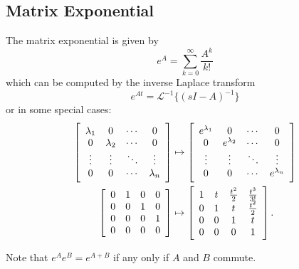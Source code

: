 \documentclass{report}
\begin{document}
\subsection{Matrix Exponential}
The matrix exponential is given by
$$
e^{A} = \sum_{k=0}^\infty \frac{A^k}{k!}
$$
which can be computed by the inverse Laplace transform
$$
e^{At} = \mathcal{L}^{-1}\{(sI - A)^{-1}\}
$$
or in some special cases:
\begin{align*}
\left[\begin{array}{c c c c}
  \lambda_1 & 0          & \cdots & 0      \\
  0         & \lambda_2  & \cdots & 0      \\
  \vdots    & \vdots     & \ddots & \vdots \\
  0         & 0          & \cdots & \lambda_n
\end{array}\right]
& \mapsto
\left[\begin{array}{c c c c}
  e^{\lambda_1} & 0           & \cdots & 0      \\
  0           & e^{\lambda_2} & \cdots & 0      \\
  \vdots      & \vdots      & \ddots & \vdots \\
  0           & 0           & \cdots & e^{\lambda_n}
\end{array}\right] \\
\left[\begin{array}{c c c c c}
  0 & 1 & 0 & 0 \\
  0 & 0 & 1 & 0 \\
  0 & 0 & 0 & 1 \\
  0 & 0 & 0 & 0
\end{array}\right]
& \mapsto
\left[\begin{array}{c c c c}
  1 & t & \frac{t^2}{2} & \frac{t^3}{3!} \\
  0 & 1 & t             & \frac{t^2}{2}  \\
  0 & 0 & 1             & t              \\
  0 & 0 & 0             & 1
\end{array}\right].
\end{align*}

Note that $e^{A} e^{B} = e^{A + B}$ if any only if $A$ and $B$ commute.
\end{document}
